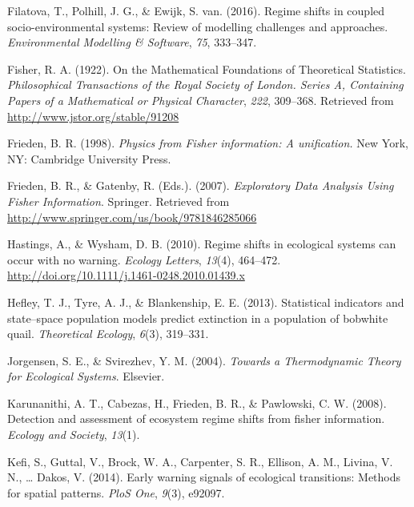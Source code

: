 \documentclass[12pt,twoside,openany]{reedthesis}
\begin{document}
\leavevmode\hypertarget{ref-filatova2016regime}{}%
Filatova, T., Polhill, J. G., \& Ewijk, S. van. (2016). Regime shifts in coupled socio-environmental systems: Review of modelling challenges and approaches. \emph{Environmental Modelling \& Software}, \emph{75}, 333--347.

\leavevmode\hypertarget{ref-fisher_mathematical_1922}{}%
Fisher, R. A. (1922). On the Mathematical Foundations of Theoretical Statistics. \emph{Philosophical Transactions of the Royal Society of London. Series A, Containing Papers of a Mathematical or Physical Character}, \emph{222}, 309--368. Retrieved from \url{http://www.jstor.org/stable/91208}

\leavevmode\hypertarget{ref-frieden_physics_1998}{}%
Frieden, B. R. (1998). \emph{Physics from Fisher information: A unification.} New York, NY: Cambridge University Press.

\leavevmode\hypertarget{ref-frieden_exploratory_2007}{}%
Frieden, B. R., \& Gatenby, R. (Eds.). (2007). \emph{Exploratory Data Analysis Using Fisher Information}. Springer. Retrieved from \url{http://www.springer.com/us/book/9781846285066}

\leavevmode\hypertarget{ref-hastings_regime_2010}{}%
Hastings, A., \& Wysham, D. B. (2010). Regime shifts in ecological systems can occur with no warning. \emph{Ecology Letters}, \emph{13}(4), 464--472. \url{http://doi.org/10.1111/j.1461-0248.2010.01439.x}

\leavevmode\hypertarget{ref-hefley2013statistical}{}%
Hefley, T. J., Tyre, A. J., \& Blankenship, E. E. (2013). Statistical indicators and state--space population models predict extinction in a population of bobwhite quail. \emph{Theoretical Ecology}, \emph{6}(3), 319--331.

\leavevmode\hypertarget{ref-jorgensen_towards_2004}{}%
Jorgensen, S. E., \& Svirezhev, Y. M. (2004). \emph{Towards a Thermodynamic Theory for Ecological Systems}. Elsevier.

\leavevmode\hypertarget{ref-karunanithi_detection_2008}{}%
Karunanithi, A. T., Cabezas, H., Frieden, B. R., \& Pawlowski, C. W. (2008). Detection and assessment of ecosystem regime shifts from fisher information. \emph{Ecology and Society}, \emph{13}(1).

\leavevmode\hypertarget{ref-kefi2014early}{}%
Kefi, S., Guttal, V., Brock, W. A., Carpenter, S. R., Ellison, A. M., Livina, V. N., \ldots{} Dakos, V. (2014). Early warning signals of ecological transitions: Methods for spatial patterns. \emph{PloS One}, \emph{9}(3), e92097.
\end{document}
